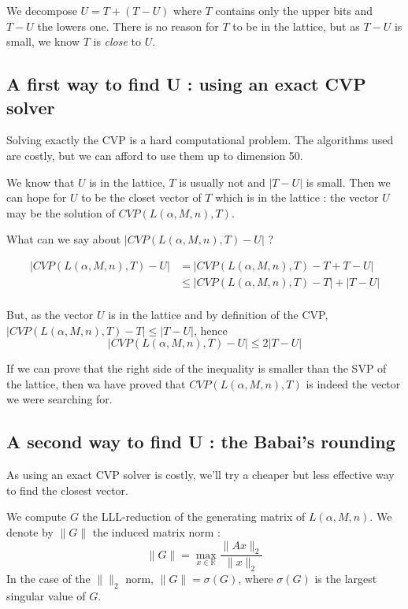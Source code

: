 \documentclass[preprint,svgnames]{iacrtrans}
\begin{document}
We decompose \(U = T + (T-U)\) where \(T\) contains only the upper bits and \(T-U\) the lowers one. There is no reason for \(T\) to be in the lattice, but as \(T-U\) is small, we know \(T\) is \emph{close} to \(U\).

 \subsection{A first way to find U : using an exact CVP solver}

Solving exactly the CVP is a hard computational problem. The algorithms used are costly, but we can afford to use them up to dimension 50.

We know that \(U\) is in the lattice, \(T\) is usually not and \(|T-U|\) is small. Then we can hope for \(U\) to be the closet vector of \(T\) which is in the lattice : the vector \(U\) may be the solution of \(CVP(L(\alpha,M,n),T)\).

What can we say about \(|CVP(L(\alpha,M,n),T)-U|\) ?

\begin{align*}
|CVP(L(\alpha,M,n),T)-U| &= |CVP(L(\alpha,M,n),T)-T+T-U|\\
& \leqslant |CVP(L(\alpha,M,n),T)-T|+|T-U|\\
\end{align*}

But, as the vector \(U\) is in the lattice and by definition of the CVP, \(|CVP(L(\alpha,M,n),T)-T| \leqslant |T-U| \), hence 
\[|CVP(L(\alpha,M,n),T)-U|\leqslant 2|T-U|\]

If we can prove that the right side of the inequality is smaller than the SVP of the lattice, then wa have proved that \(CVP(L(\alpha,M,n),T)\) is indeed the vector we were searching for.

\subsection{A second way to find U : the Babai's rounding}

As using an exact CVP solver is costly, we'll try a cheaper but less effective way to find the closest vector.

We compute \(G\) the LLL-reduction of the generating matrix of \(L(\alpha,M,n)\). We denote by  \(\rVert G \lVert\) the induced matrix norm :
\[\rVert G \lVert =  \max_{x \in \mathbb{R}}\frac{\lVert Ax \rVert_2}{\lVert x \rVert_2}\]
In the case of the \(\lVert\rVert_2\) norm, \(\rVert G \lVert = \sigma(G)\), where \(\sigma(G)\) is the largest singular value of \(G\). 
\end{document}
